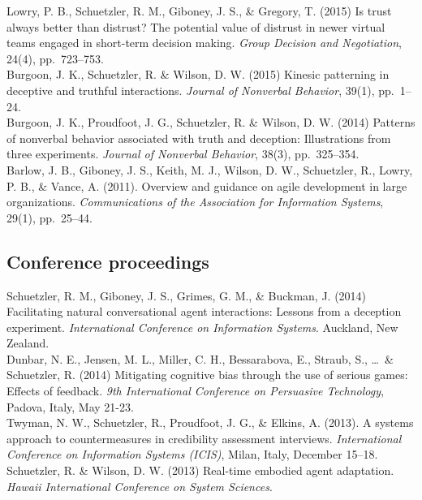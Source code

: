 \documentclass[10pt, letter]{article}
\newcommand{\years}[1]{\marginnote{\scriptsize #1}}
\begin{document}
\years{2015}Lowry, P. B., Schuetzler, R. M., Giboney, J. S., \& Gregory, T. (2015)
Is trust always better than distrust? The potential value of distrust in newer virtual
teams engaged in short-term decision making. \emph{Group Decision and
  Negotiation}, 24(4), pp.\ 723--753.\\

\years{}Burgoon, J. K., Schuetzler, R. \& Wilson, D. W. (2015) Kinesic patterning in
deceptive and truthful interactions.  \emph{Journal of Nonverbal Behavior}, 39(1), pp.\ 1--24.\\

\years{2014}Burgoon, J. K., Proudfoot, J. G., Schuetzler, R. \& Wilson, D. W. (2014)
Patterns of nonverbal behavior associated with truth and deception: Illustrations from
three experiments. \emph{Journal of Nonverbal
  Behavior}, 38(3), pp.\ 325--354.\\

\years{2011}Barlow, J. B., Giboney, J. S., Keith, M. J., Wilson, D. W., Schuetzler, R.,
Lowry, P. B., \& Vance, A. (2011). Overview and guidance on agile development in large
organizations. \emph{Communications of the Association for Information Systems}, 29(1),
pp.\ 25--44.

\subsection*{Conference proceedings}
\noindent
\years{2014}Schuetzler, R. M., Giboney, J. S., Grimes, G. M., \& Buckman,
J. (2014) Facilitating natural conversational agent interactions: Lessons from a
deception experiment. \emph{International Conference on Information Systems}. Auckland, New Zealand.\\

Dunbar, N. E., Jensen, M. L., Miller, C. H., Bessarabova, E.,
Straub, S., \ldots~\& Schuetzler, R. (2014) Mitigating cognitive bias through
the use of serious games: Effects of feedback. \emph{9th International
  Conference on
  Persuasive Technology}, Padova, Italy, May 21-23.\\

\years{2013}Twyman, N. W., Schuetzler, R., Proudfoot, J. G., \& Elkins,
A. (2013). A systems approach to countermeasures in credibility assessment
interviews. \emph{International Conference on Information Systems (ICIS)},
Milan, Italy, December 15--18.\\

Schuetzler, R. \& Wilson, D. W. (2013) Real-time embodied agent
adaptation. \emph{Hawaii International Conference on System Sciences}.\\
\end{document}
